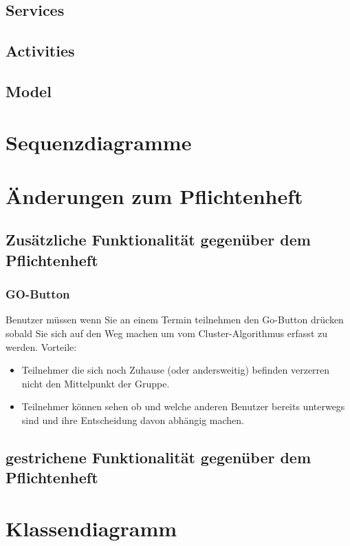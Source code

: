 \documentclass{scrartcl}
\begin{document}
	\subsection{Services}
	\subsection{Activities}
	\subsection{Model}
	\newpage

	\section{Sequenzdiagramme}
	\newpage

	\section{Änderungen zum Pflichtenheft}
	\subsection{Zusätzliche Funktionalität gegenüber dem Pflichtenheft}
	\subsubsection{GO-Button}
		Benutzer müssen wenn Sie an einem Termin teilnehmen den Go-Button drücken sobald Sie sich auf den Weg machen um vom Cluster-Algorithmus erfasst zu werden. 
		\newline
		Vorteile:
		\begin{itemize}
		\item Teilnehmer die sich noch Zuhause (oder andersweitig) befinden verzerren nicht den Mittelpunkt der Gruppe.
		\item Teilnehmer können sehen ob und welche anderen Benutzer bereits unterwegs sind und ihre Entscheidung davon abhängig machen.
		\end{itemize}
	\subsection{gestrichene Funktionalität gegenüber dem Pflichtenheft}
	\newpage
	
	\section{Klassendiagramm}	
\end{document}
